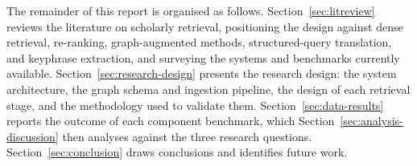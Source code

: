 The remainder of this report is organised as follows. Section~\ref{sec:litreview} reviews the literature on scholarly retrieval, positioning the design against dense retrieval, re-ranking, graph-augmented methods, structured-query translation, and keyphrase extraction, and surveying the systems and benchmarks currently available. Section~\ref{sec:research-design} presents the research design: the system architecture, the graph schema and ingestion pipeline, the design of each retrieval stage, and the methodology used to validate them. Section~\ref{sec:data-results} reports the outcome of each component benchmark, which Section~\ref{sec:analysis-discussion} then analyses against the three research questions. Section~\ref{sec:conclusion} draws conclusions and identifies future work.